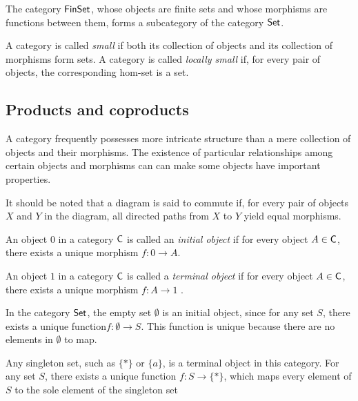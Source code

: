 \begin{example}
  The category $\mathsf{FinSet}$, whose objects are finite sets and whose morphisms are functions between them, forms a subcategory of the category $\mathsf{Set}$.
\end{example}


\begin{definition}
  A category is called \emph{small} if both its collection of objects and its collection of morphisms form sets.
A category is called \emph{locally small} if, for every pair of objects, the corresponding hom-set is a set.
\end{definition}






\subsection{Products and coproducts}

 A category frequently possesses more intricate structure than a mere collection of objects and their morphisms. The existence of particular relationships among certain objects and morphisms can can make some objects have important properties.

It should be noted that a diagram is said to commute if, for every pair of objects $X$ and $Y$ in the diagram, all directed paths from 
$X$ to $Y$ yield equal morphisms.

\begin{definition}
  An object \( 0 \) in a category \( \mathsf{C} \) is called an \emph{initial object} if for every object \( A \in \mathsf{C}  \), there exists a unique morphism  $f: 0 \to A $.

\end{definition}

\begin{definition}
  An object \( 1 \) in a category \( \mathsf{C}  \) is called a \emph{terminal object} if for every object \( A \in \mathsf{C}  \), there exists a unique morphism $ f: A \to 1 $ .
\end{definition}

\begin{example}
In the category \( \mathsf{Set} \), the empty set \( \emptyset \) is an initial object, since for any set \( S \), there exists a unique function$f : \emptyset \to S.$
This function is unique because there are no elements in \( \emptyset \) to map.

Any singleton set, such as \( \{*\} \) or \( \{a\} \), is a terminal object in this category. For any set \( S \), there exists a unique function $f : S \to \{*\}$,
which maps every element of \( S \) to the sole element of the singleton set
\end{example}

